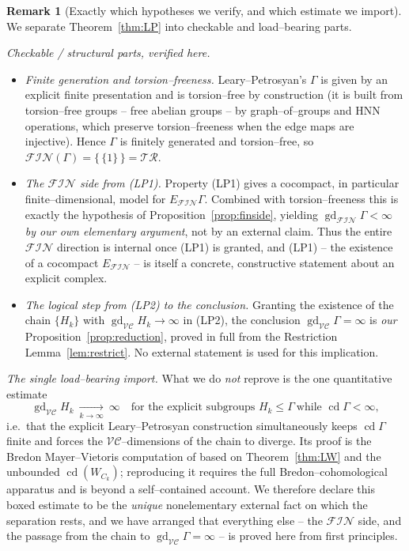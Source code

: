 \documentclass{amsart}
\theoremstyle{definition}
\newtheorem{remark}{Remark}
\newcommand{\FIN}{\mathcal{F\!I\!N}}
\newcommand{\VC}{\mathcal{V\!C}}
\newcommand{\gd}{\operatorname{gd}}
\newcommand{\cd}{\operatorname{cd}}
\begin{document}
\begin{remark}[Exactly which hypotheses we verify, and which estimate we import]\label{rem:blackbox}
We separate Theorem~\ref{thm:LP} into checkable and load--bearing parts.

\emph{Checkable / structural parts, verified here.}
\begin{itemize}
\item \emph{Finite generation and torsion--freeness.} Leary--Petrosyan's $\Gamma$ is given by
an explicit finite presentation and is torsion--free by construction (it is built from
torsion--free groups -- free abelian groups -- by graph--of--groups and HNN operations, which
preserve torsion--freeness when the edge maps are injective). Hence $\Gamma$ is finitely
generated and torsion--free, so $\FIN(\Gamma)=\{\,\{1\}\,\}=\mathcal{TR}$.
\item \emph{The $\FIN$ side from \textup{(LP1)}.} Property (LP1) gives a cocompact, in
particular finite--dimensional, model for $E_{\FIN}\Gamma$. Combined with torsion--freeness
this is exactly the hypothesis of Proposition~\ref{prop:finside}, yielding
$\gd_{\FIN}\Gamma<\infty$ \emph{by our own elementary argument}, not by an external claim. Thus
the entire $\FIN$ direction is internal once (LP1) is granted, and (LP1) -- the existence of a
cocompact $E_{\FIN}$ -- is itself a concrete, constructive statement about an explicit complex.
\item \emph{The logical step from \textup{(LP2)} to the conclusion.} Granting the existence of
the chain $\{H_k\}$ with $\gd_{\VC}H_k\to\infty$ in (LP2), the conclusion
$\gd_{\VC}\Gamma=\infty$ is \emph{our} Proposition~\ref{prop:reduction}, proved in full from
the Restriction Lemma~\ref{lem:restrict}. No external statement is used for this implication.
\end{itemize}

\emph{The single load--bearing import.} What we do \emph{not} reprove is the one quantitative
estimate
\[
\boxed{\ \gd_{\VC}H_k\ \xrightarrow[k\to\infty]{}\ \infty\quad\text{for the explicit
subgroups }H_k\le\Gamma\ \text{while }\cd\Gamma<\infty,\ }
\]
i.e.\ that the explicit Leary--Petrosyan construction simultaneously keeps $\cd\Gamma$ finite
and forces the $\VC$--dimensions of the chain to diverge. Its proof is the Bredon
Mayer--Vietoris computation of \cite[\S\S1--4]{LearyPetrosyan} based on Theorem~\ref{thm:LW} and
the unbounded $\cd(W_{C_k})$; reproducing it requires the full Bredon--cohomological apparatus
and is beyond a self--contained account. We therefore declare this boxed estimate to be the
\emph{unique} nonelementary external fact on which the separation rests, and we have arranged
that everything else -- the $\FIN$ side, and the passage from the chain to
$\gd_{\VC}\Gamma=\infty$ -- is proved here from first principles.
\end{remark}
\end{document}
